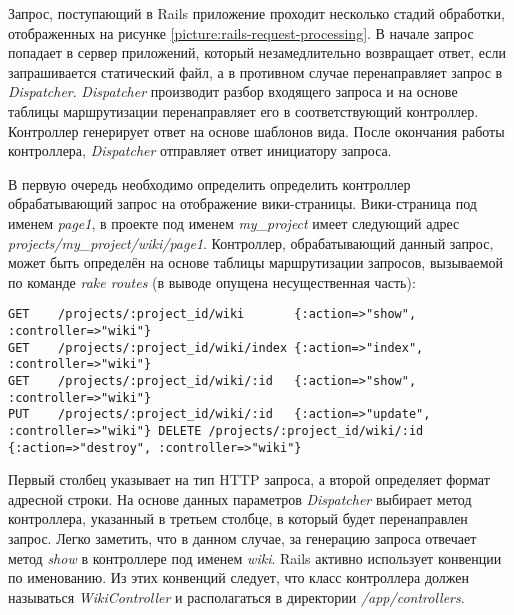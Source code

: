 Запрос, поступающий в Rails приложение проходит несколько стадий обработки,
отображенных на рисунке \ref{picture:rails-request-processing}.
В начале запрос попадает в сервер приложений, который незамедлительно
возвращает ответ, если запрашивается статический файл, а в противном случае
перенаправляет запрос в \textit{Dispatcher}. \textit{Dispatcher} производит
разбор входящего запроса и на основе таблицы маршрутизации перенаправляет его в
соответствующий контроллер. Контроллер генерирует ответ на основе шаблонов
вида. После окончания работы контроллера, \textit{Dispatcher} отправляет ответ
инициатору запроса.

В первую очередь необходимо определить определить контроллер обрабатывающий
запрос на отображение вики-страницы. Вики-страница под именем \textit{page1}, в
проекте под именем \textit{my\_project} имеет следующий адрес
\textit{projects/my\_project/wiki/page1}. Контроллер, обрабатывающий данный
запрос, может быть определён на основе таблицы маршрутизации запросов,
вызываемой по команде \textit{rake routes} (в выводе опущена несущественная
часть):
\small{\begin{lstlisting}
GET    /projects/:project_id/wiki       {:action=>"show", :controller=>"wiki"}
GET    /projects/:project_id/wiki/index {:action=>"index", :controller=>"wiki"}
GET    /projects/:project_id/wiki/:id   {:action=>"show", :controller=>"wiki"}
PUT    /projects/:project_id/wiki/:id   {:action=>"update",
:controller=>"wiki"} DELETE /projects/:project_id/wiki/:id  
{:action=>"destroy", :controller=>"wiki"}
\end{lstlisting}}
Первый столбец указывает на тип HTTP запроса, а второй определяет формат
адресной строки. На основе данных параметров \textit{Dispatcher} выбирает метод
контроллера, указанный в третьем столбце, в который будет перенаправлен запрос.
Легко заметить, что в данном случае, за генерацию запроса отвечает метод
\textit{show} в контроллере под именем \textit{wiki}. Rails активно использует
конвенции по именованию. Из этих конвенций следует, что класс контроллера
должен называться \textit{WikiController} и располагаться в директории
\textit{/app/controllers}.

